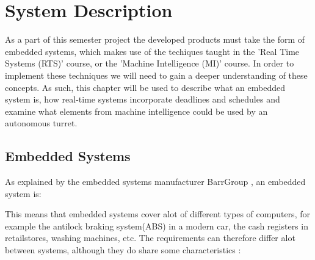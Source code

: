 \chapter{System Description}\label{SystemDescription}
As a part of this semester project the developed products must take the form of
embedded systems, which makes use of the techiques taught in the 'Real Time
Systems (RTS)' course, or the 'Machine Intelligence (MI)' course. In order to
implement these techniques we will need to gain a deeper understanding of these
concepts. As such, this chapter will be used to describe what an embedded system
is, how real-time systems incorporate deadlines and schedules and examine what
elements from machine intelligence could be used by an autonomous turret.

\section{Embedded Systems}
As explained by the embedded systems manufacturer BarrGroup
\citep{Barr_Embedded}, an embedded system is: \nl

\begin{center}
\begin{minipage}{0.8\linewidth}
\end{minipage}
\end{center}
% 

This means that embedded systems cover alot of different types of computers, for example
the antilock braking system(ABS) in a modern car, the cash registers in retailstores, washing machines, etc.
The requirements can therefore differ alot between systems, although they do
share some characteristics \citep[ch.1.1]{vahid1999embedded}:

